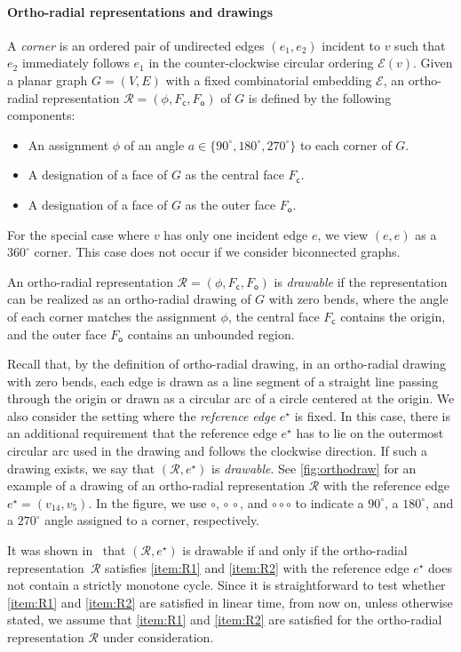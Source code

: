 \documentclass{article}\usepackage[a4paper,margin=20mm]{geometry}
\newcommand{\RR}{\mathcal{R}}
\newcommand{\EE}{\mathcal{E}}
\newcommand{\FC}{F_\mathsf{c}}
\newcommand{\FO}{F_\mathsf{o}}
\newcommand{\eref}{e^\star}
\begin{document}
\paragraph{Ortho-radial representations and drawings} A \emph{corner} is an ordered pair of undirected edges $(e_1, e_2)$ incident to $v$ such that $e_2$ immediately follows $e_1$ in the counter-clockwise circular ordering $\EE(v)$. Given a planar graph $G=(V,E)$  with a fixed combinatorial embedding $\EE$,
an ortho-radial representation $\RR=(\phi, \FC, \FO)$ of $G$ is defined by the following components:
\begin{itemize}
    \item An assignment $\phi$ of an angle $a \in \{90^\circ, 180^\circ, 270^\circ\}$ to each corner of $G$.
    \item A designation of a face of $G$ as the central face $\FC$.
    \item A designation of a face of $G$ as the outer face $\FO$.
\end{itemize}
For the special case where $v$ has only one incident edge $e$, we view $(e,e)$ as a $360^\circ$ corner. This case does not occur if we consider biconnected graphs.

An ortho-radial representation $\RR=(\phi, \FC, \FO)$ is \emph{drawable} if the representation can be realized as an ortho-radial drawing of $G$ with zero bends, where the angle of each corner matches the assignment $\phi$, the central face $\FC$ contains the origin, and the outer face $\FO$ contains an unbounded region.




Recall that, by the definition of ortho-radial drawing, in an ortho-radial drawing with zero bends, each edge is drawn as a line segment of a straight line passing through the origin or drawn as a circular arc of a circle centered at the origin. We also consider the setting where the \emph{reference edge} $\eref$ is fixed.
In this case, there is an additional requirement that the reference edge $\eref$ has to lie on the outermost circular arc used in the drawing and follows the clockwise direction. If such a drawing exists, we say that $(\RR, \eref)$ is \emph{drawable}. 
See \cref{fig:orthodraw} for an example of a drawing of an ortho-radial representation $\RR$ with the reference edge $\eref=(v_{14},v_5)$. In the figure, we use $\circ$, $\circ \, \circ$, and $\circ \circ \circ$ to indicate a $90^\circ$, a $180^\circ$, and a $270^\circ$ angle assigned to a corner, respectively.


It was shown in~\cite{barth2023topology} that $(\RR, \eref)$ is drawable if and only if the ortho-radial representation~$\RR$ satisfies \ref{item:R1} and \ref{item:R2} with the reference edge $\eref$ does not contain a strictly monotone cycle. Since it is straightforward to test whether \ref{item:R1} and \ref{item:R2} are satisfied in linear time, from now on, unless otherwise stated, we assume that \ref{item:R1} and \ref{item:R2} are satisfied for the ortho-radial representation $\RR$ under consideration.
\end{document}
